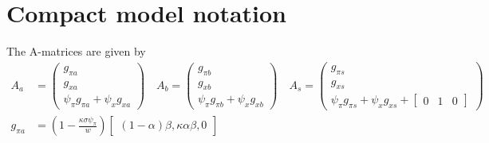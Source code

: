 \documentclass[11pt]{article}
\renewcommand{\[}{\begin{equation}}
\renewcommand{\]}{\end{equation}}
\begin{document}
\section{Compact model notation}\label{app_compact} 
The A-matrices are given by
\begin{align}
A_a & = \begin{pmatrix} g_{\pi a} \\ g_{x a} \\ \psi_{\pi}g_{\pi a} + \psi_xg_{x a}
\end{pmatrix}
\quad A_b = \begin{pmatrix} g_{\pi b} \\ g_{x b} \\ \psi_{\pi}g_{\pi b} + \psi_xg_{x b}
\end{pmatrix}
 \quad A_s = \begin{pmatrix} g_{\pi s} \\ g_{x s} \\ \psi_{\pi}g_{\pi s} + \psi_xg_{x s} + \begin{bmatrix} 0 & 1& 0\end{bmatrix}
\end{pmatrix} \\
g_{\pi a} & =(1-\frac{\kappa\sigma\psi_{\pi}}{w} )  \begin{bmatrix}(1-\alpha)\beta, \kappa\alpha\beta, 0 \end{bmatrix} \\

\end{align}
\end{document}
